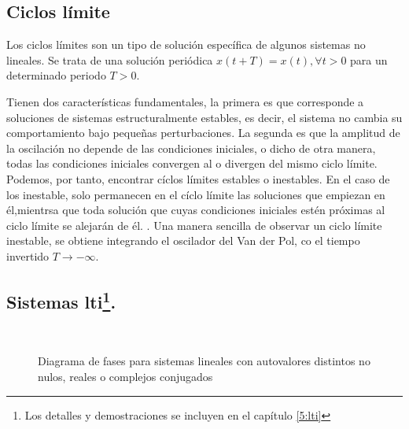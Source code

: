 \subsection{Ciclos límite}
Los ciclos límites son un tipo de solución específica de algunos sistemas no lineales. Se trata de una solución periódica $x(t+T) =x(t), \forall t>0$ para un determinado periodo  $T>0$. 

Tienen dos características fundamentales, la primera es que corresponde a soluciones de sistemas estructuralmente estables, es decir, el sistema no cambia su comportamiento bajo pequeñas perturbaciones. La segunda es que la amplitud de la oscilación no depende de las condiciones iniciales, o dicho  de otra manera, todas las condiciones iniciales convergen al o divergen del mismo ciclo límite. Podemos, por tanto, encontrar cíclos límites estables o inestables. En el caso de los inestable, solo permanecen en el cíclo límite las soluciones que empiezan en él,mientrsa que toda solución que cuyas condiciones iniciales estén próximas al ciclo límite se alejarán de él. . Una manera sencilla de observar un ciclo límite inestable, se obtiene integrando el oscilador del Van der Pol, co el tiempo invertido $T\to -\infty$.





\subsection{Sistemas lti\protect\footnote{Los detalles y demostraciones se incluyen en el capítulo \ref{5:lti}}. }

\begin{figure}[h] 
\\
\caption{Diagrama de fases para sistemas lineales con autovalores distintos no nulos, reales o complejos conjugados}\label{fig:lin1}
\end{figure}

